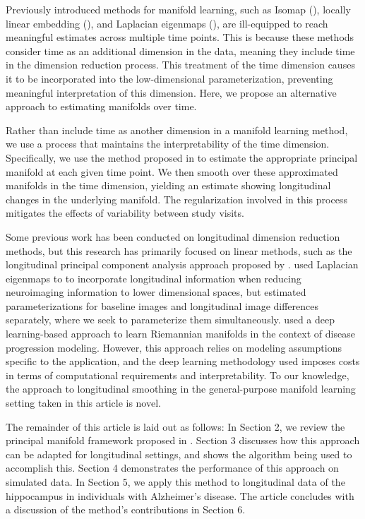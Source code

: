 \documentclass[11pt,reqno]{article}
\theoremstyle{definition}
\begin{document}
Previously introduced methods for manifold learning, such as Isomap (\cite{tenenbaumGlobalGeometricFramework2000}), locally linear embedding (\cite{roweisNonlinearDimensionalityReduction2000}), and Laplacian eigenmaps (\cite{belkinLaplacianEigenmapsDimensionality2003a}), are ill-equipped to reach meaningful estimates across multiple time points. This is because these methods consider time as an additional dimension in the data, meaning they include time in the dimension reduction process. This treatment of the time dimension causes it to be incorporated into the low-dimensional parameterization, preventing meaningful interpretation of this dimension. Here, we propose an alternative approach to estimating manifolds over time.

Rather than include time as another dimension in a manifold learning method, we use a process that maintains the interpretability of the time dimension. Specifically, we use the method proposed in \cite{mengPrincipalManifoldEstimation2021} to estimate the appropriate principal manifold at each given time point. We then smooth over these approximated manifolds in the time dimension, yielding an estimate showing longitudinal changes in the underlying manifold. The regularization involved in this process mitigates the effects of variability between study visits.

Some previous work has been conducted on longitudinal dimension reduction methods, but this research has primarily focused on linear methods, such as the longitudinal principal component analysis approach proposed by \cite{kinsonLongitudinalPrincipalComponent2020}. \cite{wolzManifoldLearningBiomarker2010a} used Laplacian eigenmaps to to incorporate longitudinal information when reducing neuroimaging information to lower dimensional spaces, but estimated parameterizations for baseline images and longitudinal image differences separately, where we seek to parameterize them simultaneously. \cite{louisRiemannianGeometryLearning2019} used a deep learning-based approach to learn Riemannian manifolds in the context of disease progression modeling. However, this approach relies on modeling assumptions specific to the application, and the deep learning methodology used imposes costs in terms of computational requirements and interpretability. To our knowledge, the approach to longitudinal smoothing in the general-purpose manifold learning setting taken in this article is novel.

The remainder of this article is laid out as follows: In Section 2, we review the principal manifold framework proposed in \cite{mengPrincipalManifoldEstimation2021}. Section 3 discusses how this approach can be adapted for longitudinal settings, and shows the algorithm being used to accomplish this. Section 4 demonstrates the performance of this approach on simulated data. In Section 5, we apply this method to longitudinal data of the hippocampus in individuals with Alzheimer's disease. The article concludes with a discussion of the method's contributions in Section 6.
\end{document}
